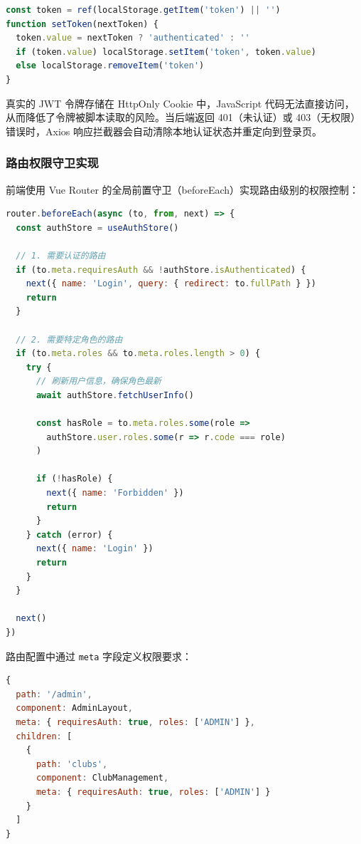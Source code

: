 \begin{lstlisting}[language=JavaScript, caption=前端认证状态管理（节选）]
const token = ref(localStorage.getItem('token') || '')
function setToken(nextToken) {
  token.value = nextToken ? 'authenticated' : ''
  if (token.value) localStorage.setItem('token', token.value)
  else localStorage.removeItem('token')
}
\end{lstlisting}

真实的 JWT 令牌存储在 HttpOnly Cookie 中，JavaScript 代码无法直接访问，从而降低了令牌被脚本读取的风险。当后端返回 401（未认证）或 403（无权限）错误时，Axios 响应拦截器会自动清除本地认证状态并重定向到登录页。

\subsubsection{路由权限守卫实现}

前端使用 Vue Router 的全局前置守卫（beforeEach）实现路由级别的权限控制：

\begin{lstlisting}[language=JavaScript, caption=路由守卫实现（节选）]
router.beforeEach(async (to, from, next) => {
  const authStore = useAuthStore()

  // 1. 需要认证的路由
  if (to.meta.requiresAuth && !authStore.isAuthenticated) {
    next({ name: 'Login', query: { redirect: to.fullPath } })
    return
  }

  // 2. 需要特定角色的路由
  if (to.meta.roles && to.meta.roles.length > 0) {
    try {
      // 刷新用户信息，确保角色最新
      await authStore.fetchUserInfo()

      const hasRole = to.meta.roles.some(role =>
        authStore.user.roles.some(r => r.code === role)
      )

      if (!hasRole) {
        next({ name: 'Forbidden' })
        return
      }
    } catch (error) {
      next({ name: 'Login' })
      return
    }
  }

  next()
})
\end{lstlisting}

路由配置中通过 \texttt{meta} 字段定义权限要求：

\begin{lstlisting}[language=JavaScript, caption=路由配置示例]
{
  path: '/admin',
  component: AdminLayout,
  meta: { requiresAuth: true, roles: ['ADMIN'] },
  children: [
    {
      path: 'clubs',
      component: ClubManagement,
      meta: { requiresAuth: true, roles: ['ADMIN'] }
    }
  ]
}
\end{lstlisting}

